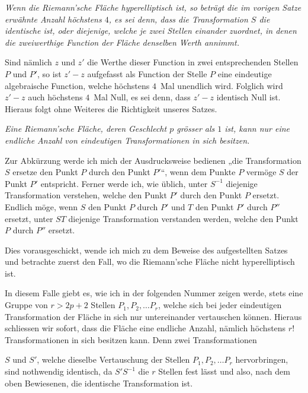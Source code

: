 \documentclass{article}
\begin{document}
\emph{Wenn die Riemann'sche Fläche hyperelliptisch ist, so beträgt die im vorigen Satze erwähnte Anzahl höchstens $4$, es sei denn, dass die Transformation $S$ die identische ist, oder diejenige, welche je zwei Stellen einander zuordnet, in denen die zweiwerthige Function der Fläche denselben Werth annimmt.}

Sind nämlich $z$ und $z'$ die Werthe dieser Function in zwei entsprechenden Stellen $P$ und $P'$, so ist $z' - z$ aufgefasst als Function der Stelle $P$ eine eindeutige algebraische Function, welche höchstens $4$~Mal unendlich wird. Folglich wird $z' - z$ auch höchstens $4$~Mal Null, es sei denn, dass $z' - z$ identisch Null ist. Hieraus folgt ohne Weiteres die Richtigkeit unseres Satzes.

\emph{Eine Riemann'sche Fläche, deren Geschlecht $p$ grösser als $1$ ist, kann nur eine endliche Anzahl von eindeutigen Transformationen in sich besitzen.}

Zur Abkürzung werde ich mich der Ausdrucksweise bedienen „die Transformation $S$ ersetze den Punkt $P$ durch den Punkt $P'$“, wenn dem Punkte $P$ vermöge $S$ der Punkt $P'$ entspricht. Ferner werde ich, wie üblich, unter $S^{-1}$ diejenige Transformation verstehen, welche den Punkt $P'$ durch den Punkt $P$ ersetzt. Endlich möge, wenn $S$ den Punkt $P$ durch $P'$ und $T$ den Punkt $P'$ durch $P''$ ersetzt, unter $ST$ diejenige Transformation verstanden werden, welche den Punkt $P$ durch $P''$ ersetzt.

Dies vorausgeschickt, wende ich mich zu dem Beweise des aufgestellten Satzes und betrachte zuerst den Fall, wo die Riemann'sche Fläche nicht hyperelliptisch ist.

In diesem Falle giebt es, wie ich in der folgenden Nummer zeigen werde, stets eine Gruppe von $r > 2p+2$ Stellen $P_1, P_2, \dots P_r$, welche sich bei jeder eindeutigen Transformation der Fläche in sich nur untereinander vertauschen können. Hieraus schliessen wir sofort, dass die Fläche eine endliche Anzahl, nämlich höchstens $r!$ Transformationen in sich besitzen kann. Denn zwei Transformationen

$S$ und $S'$, welche dieselbe Vertauschung der Stellen $P_1, P_2, \dots P_r$ hervorbringen, sind nothwendig identisch, da $S'S^{-1}$ die $r$ Stellen fest lässt und also, nach dem oben Bewiesenen, die identische Transformation ist.
\end{document}
